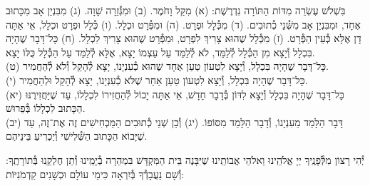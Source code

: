 \documentclass[twoside, openany, parskip=half, 11pt]{book}
\begin{document}
בִּשְׁלֹשׁ עֶשְׂרֵה מִדּוֹת הַתּוֹרָה נִדְרֶשֶׁת:\hfill \break
(א) מִקַּל וָחֹמֶר.\hfill \break
(ב) וּמִגְּ֯זֵרָה שָׁוָה.\hfill \break
(ג) מִבִּנְיַן אָב מִכָּתוּב אֶחָד, וּמִבִּנְיַן אָב מִשְּׁ֯נֵי כְ֯תוּבִים.\hfill \break
(ד) מִכְּ֯לָל וּפְרָט.\hfill \break
(ה) וּמִפְּ֯רָט וּכְלָל.\hfill \break
(ו) כְּ֯לָל וּפְרָט וּכְלָל, אֵי אַתָּה דָן אֶלָּא כְּ֯עֵין הַפְּ֯רָט.\hfill \break
(ז) מִכְּ֯לָל שֶׁהוּא צָרִיךְ לִפְרָט, וּמִפְּ֯רָט שֶׁהוּא צָרִיךְ לִכְלָל.\hfill \break
(ח) כָּל־דָּבָר שֶׁהָיָה בִּכְלָל וְ֯יָצָא מִן הַכְּ֯לָל לְ֯לַמֵּד, לֹא לְ֯לַמֵּד עַל עַצְמוֹ יָצָא, אֶלָּא לְ֯לַמֵּד עַל הַכְּ֯לָל כֻּלּוֹ יָצָא. \\
(ט) כָּל־דָּבָר שֶׁהָיָה בִּכְלָל, וְ֯יָצָא לִטְעוֹן טַעַן אֶחָד שֶׁהוּא כְ֯עִנְיָנוֹ, יָצָא לְ֯הָקֵל וְ֯לֹא לְ֯הַחֲמִיר. \\
(י) כָּל־דָּבָר שֶׁהָיָה בִּכְלָל, וְ֯יָצָא לִטְעוֹן טַעַן אַחֵר שֶׁלֹּא כְ֯עִנְיָנוֹ, יָצָא לְ֯הָקֵל וּלְהַחֲמִיר. \\
(יא) כָּל־דָּבָר שֶׁהָיָה בִּכְלָל וְ֯יָצָא לִדּוֹן בְּ֯דָבָר חָדָשׁ, אֵי אַתָּה יָכוֹל לְ֯הַחֲזִירוֹ לִכְלָלוֹ, עַד שֶׁיַּחֲזִירֶנּוּ הַכָּתוּב לִכְלָלוֹ בְּ֯פֵרוּשׁ. \\
(יב) דָּבָר הַלָּמֵד מֵעִנְיָנוֹ, וְ֯דָבָר הַלָּמֵד מִסּוֹפוֹ.\hfill \break
(יג) וְ֯כֵן שְׁנֵי כְ֯תוּבִים הַמַּכְחִישִׁים זֶה אֶת־זֶה, עַד שֶׁיָּבוֹא הַכָּתוּב הַשְּׁ֯לִישִׁי וְ֯יַכְרִיעַ בֵּינֵיהֶם.

יְ֯הִי רָצוֹן מִלְּ֯פָנֶֽיךָ יְיָ אֱלֹהֵֽינוּ וֵאלֹהֵי אֲבוֹתֵֽינוּ שֶׁיִּבָּנֶה בֵּית הַמִּקְדָּשׁ בִּמְהֵרָה בְ֯יָמֵֽינוּ וְ֯תֵן חֶלְקֵֽנוּ בְּ֯תוֹרָתֶֽךָ: וְ֯שָׁם נַעֲבָדְ֯ךָ בְּ֯יִרְאָה כִּימֵי עוֹלָם וּכְשָׁנִים קַדְמֹנִיּוֹת:


\rabbiskaddish
\end{document}
